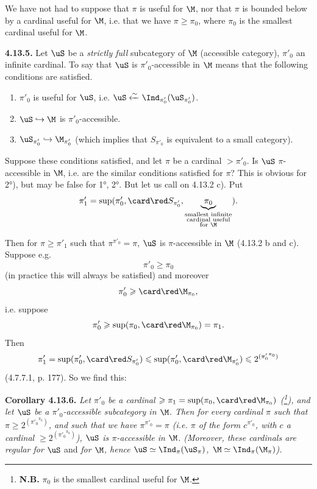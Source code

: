 We have not had to suppose that $\pi$ is useful for $\M$, nor that $\pi$ is bounded below by a cardinal useful for $\M$, i.e. that we have $\pi \geqslant \pi_0$, where $\pi_0$ is the smallest cardinal useful for $\M$.

\textbf{4.13.5.} Let $\uS$ be a \textit{strictly full} subcategory of $\M$ (accessible category), $\pi'_0$ an infinite cardinal. To say that $\uS$ is $\pi'_0$-accessible in $\M$ means that the following conditions are satisfied.
\begin{enumerate}
\item[1)] $\pi'_0$ is useful for $\uS$, i.e. $\uS \xleftarrow{\sim} \Ind_{\pi'_0}(\uS_{\pi'_0})$.
\item[2)] $\uS \hookrightarrow \M$ is $\pi'_0$-accessible.
\item[3)] $\uS_{\pi'_0} \hookrightarrow \M_{\pi'_0}$ (which implies that $S_{\pi'_0}$ is equivalent to a small category).
\end{enumerate}
Suppose these conditions satisfied, and let $\pi$ be a cardinal $> \pi'_0$. Is $\uS$ $\pi$-accessible in $\M$, i.e. are the similar conditions satisfied for $\pi$? This is obvious for 2°), but may be false for 1°, 2°. But let us call on 4.13.2 c). Put
\[
\pi'_1 = \sup(\pi'_0, \card\red S_{\pi'_0}, \underbrace{\pi_0}_{\substack{\text{smallest infinite}\\ \text{cardinal useful}\\ \text{for } \M}} ) .
\]

Then for $\pi \geqslant \pi'_1$ such that $\pi^{\pi'_0} = \pi$, $\uS$ is $\pi$-accessible in $\M$ (4.13.2 b and c). Suppose e.g.
\[
\pi'_0 \geqslant \pi_0
\]
(in practice this will always be satisfied) and moreover
\[
\pi'_0 \geqslant \card\red\M_{\pi_0} ,
\]
i.e. suppose
\[
\pi'_0 \geqslant \sup(\pi_0, \card\red\M_{\pi_0}) = \pi_1 .
\]
Then
\[
\pi'_1 = \sup(\pi'_0, \card\red S_{\pi'_0}) \leqslant \sup(\pi'_0, \card\red\M_{\pi'_0}) \leqslant 2^{({\pi'_0}^{\pi_0})}
\]
(4.7.7.1, p. 177). So we find this:

\textbf{Corollary 4.13.6.} \textit{Let $\pi'_0$ be a cardinal $\geqslant \pi_1 = \sup(\pi_0, \card\red\M_{\pi_0})$ (\footnote[118]{\textbf{N.B.} $\pi_0$ is the smallest cardinal useful for $\M$.}), and let $\uS$ be a $\pi'_0$-accessible subcategory in $\M$. Then for every cardinal $\pi$ such that $\pi \geqslant 2^{({\pi'_0}^{\pi_0})}$, and such that we have $\pi^{\pi'_0} = \pi$ (i.e. $\pi$ of the form $c^{\pi'_0}$, with $c$ a cardinal $\geqslant 2^{({\pi'_0}^{\pi_0})}$), $\uS$ is $\pi$-accessible in $\M$. (Moreover, these cardinals are regular for $\uS$} and \textit{for $\M$, hence $\uS \simeq \Ind_\pi(\uS_\pi)$, $\M \simeq \Ind_\pi(\M_\pi)$).}

